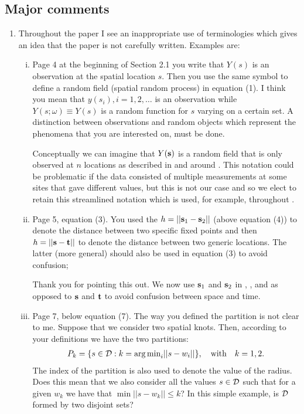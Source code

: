 \documentclass[11pt]{article}
\begin{document}
\subsection*{Major comments}
\begin{enumerate}[1.]
  \item Throughout the paper I see an inappropriate use of terminologies which gives an idea that the paper is not carefully written. Examples are:
  \begin{enumerate}[i.]
    \item Page 4 at the beginning of Section 2.1 you write that $Y(s)$ is an observation at the spatial location $s$. Then you use the same symbol to define a random field (spatial random process) in equation (1). I think you mean that $y(s_i), i = 1, 2, \ldots$ is an observation while $Y(s; \omega) \equiv Y (s)$ is a random function for $s$ varying on a certain set. A distinction between observations and random objects which represent the phenomena that you are interested on, must be done. \\

    \begin{response}
      Conceptually we can imagine that $Y(\mbox{\bf s})$ is a random field that is only observed at $n$ locations as described in and around .
      This notation could be problematic if the data consisted of multiple measurements at some sites that gave different values, but this is not our case and so we elect to retain this streamlined notation which is used, for example, throughout \citet{Gelfand2010}.
    \end{response}

    \item Page 5, equation (3). You used the $h = ||\mbox{\bf s}_1 - \mbox{\bf s}_2||$ (above equation (4)) to denote the distance between two specific fixed points and then $h = ||\mbox{\bf s} - \mbox{\bf t}||$ to denote the distance between two generic locations. The latter (more general) should also be used in equation (3) to avoid confusion; \\

    \begin{response}
      Thank you for pointing this out.
      We now use $\mbox{\bf s}_1$ and $\mbox{\bf s}_2$ in , , and  as opposed to $\mbox{\bf s}$ and $\mbox{\bf t}$ to avoid confusion between space and time.
    \end{response}

    \item Page 7, below equation (7). The way you defined the partition is not clear to me. Suppose that we consider two spatial knots. Then, according to your definitions we have the two partitions:
    \begin{align*}
      P_k = \{s \in {\cal D} : k = {\mathop{\rm arg\, min}}_i ||s - w_i||\}, \quad \text{with} \quad k= 1,2.
    \end{align*}
    The index of the partition is also used to denote the value of the radius. Does this mean that we also consider all the values $s \in {\cal D}$ such that for a given $w_k$ we have that $\min ||s - w_k|| \le k$? In this simple example, is ${\cal D}$ formed by two disjoint sets? \\


\end{enumerate}
\end{enumerate}
\end{document}
